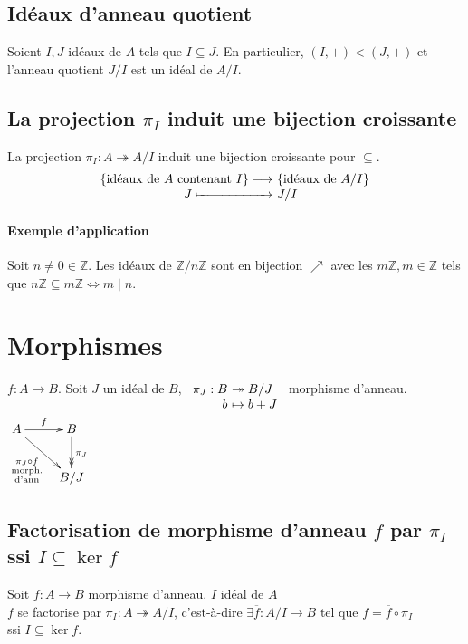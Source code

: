 \documentclass[reqno,a4paper,10pt]{report}
\newcommand{\set}[1]{\left\lbrace #1 \right\rbrace} %
\newcommand{\IZ}{\ensuremath{\mathbb{Z}}\xspace} %
\newcommand{\surj}{\twoheadrightarrow}
\begin{document}
\subsection{Idéaux d'anneau quotient}
Soient $I,J$ idéaux de $A$ tels que $I\subseteq J$. En particulier, $(I,+) <
(J,+)$ et l'anneau quotient $J/I$ est un idéal de $A/I$.

\subsection{La projection $\pi_I$ induit une bijection croissante}
La projection $\pi_I : A \surj A/I$ induit une bijection croissante pour
$\subseteq$.
\[
\begin{array}[t]{r@{\ }l}
  \set{\text{idéaux de }A\text{ contenant } I} \longrightarrow&
  \set{\text{idéaux de }A/I}\\
  J \xmapsto{\hphantom{\textstyle \text{ contenant } I}}& J/I
\end{array}
\]

\paragraph{Exemple d'application}
Soit $n\neq 0 \in \IZ$. Les idéaux de $\IZ/n\IZ$ sont en bijection $\nearrow$
avec les $m\IZ, m \in \IZ$ tels que $n\IZ \subseteq m\IZ \iff m \mid n$.

\section{Morphismes}
$f : A \to B$. Soit $J$ un idéal de $B$, $\begin{array}[t]{r@{\ }l}
  \pi_J : B &\surj B/J\\
  b &\mapsto b+ J
\end{array}$ morphisme d'anneau. $\xymatrix{
A \ar[dr]_{\substack{\pi_J \circ f\\ \text{morph.}\\ \text{d'ann}}}
\ar[r]^f & B \ar@{->>}[d]^{\pi_J}\\
  & B/J
}$

\subsection{Factorisation de morphisme d'anneau $f$ par $\pi_I$ ssi $I
\subseteq \ker f$}
Soit $f:A\to B$ morphisme d'anneau. $I$ idéal de $A$\\
$f$ se factorise par $\pi_I:A\surj A/I$, c'est-à-dire $\exists
\overline{f}:A/I \to B$ tel que $f=\overline f \circ \pi_I$\\
ssi $I\subseteq \ker f$.
\end{document}
